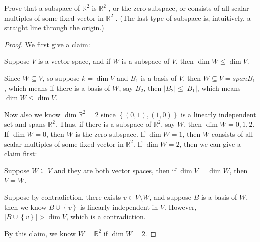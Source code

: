 \begin{problem}
Prove that a subspace of \(\mathbb{R} ^2\)  is \(\mathbb{R} ^2\) , or the zero subspace, or consists of all
scalar multiples of some fixed vector in \(\mathbb{R} ^2\) . (The last type of subspace is, intuitively, a straight line through the origin.)
\end{problem}
\begin{proof}
    We first give a claim: 
    \begin{claim}
        Suppose \(V\) is a vector space, and if \(W\) is a subspace of \(V\), then \(\dim W \le \dim V\).  
    \end{claim}
    \begin{explanation}
        Since \(W \subseteq V\), so suppose \(k=\dim V\) and \(B_1\) is a basis of \(V\), then \(W \subseteq V = span B_1\), which means if there is a basis of \(W\), say \(B_2\), then \(\vert B_2 \vert \le \vert B_1 \vert\), which means \(\dim W \le \dim V\).         
    \end{explanation}

    Now also we know \(\dim \mathbb{R} ^2 = 2\) since \(\left\{ (0,1), (1, 0) \right\} \) is a linearly independent set and spans \(\mathbb{R} ^2\). Thus, if there is a subspace of \(\mathbb{R} ^2\), say \(W\), then \(\dim W = 0, 1, 2\). If \(\dim W = 0\), then \(W\) is the zero subspace. If \(\dim W = 1\), then \(W\) consists of all scalar multiples of some fixed vector in \(\mathbb{R} ^2\). If \(\dim W = 2\), then we can give a claim first: 
    \begin{claim}
        Suppose \(W \subseteq V\) and they are both vector spaces, then if \(\dim V = \dim W\), then \(V = W\).  
    \end{claim}        
    \begin{explanation}
        Suppose by contradiction, there exists \(v \in V \setminus W\), and suppose \(B\) is a basis of \(W\), then we know \(B \cup \left\{ v \right\} \) is linearly independent in \(V\). However, \(\left\vert B \cup \left\{ v \right\}  \right\vert > \dim V \), which is a contradiction.      
    \end{explanation}  
    By this claim, we know \(W = \mathbb{R} ^2\) if \(\dim W = 2\).    
\end{proof}